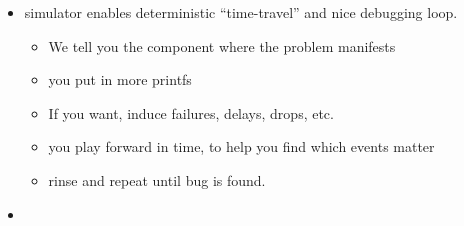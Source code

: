 \begin{itemize}
\begin{itemize}
    \item simulator enables deterministic ``time-travel'' and nice debugging
    loop.
        \begin{itemize}
        \item We tell you the component where the problem manifests
        \item you put in more printfs
        \item If you want, induce failures, delays, drops, etc.
        \item you play forward in time, to help you find which events matter
        \item rinse and repeat until bug is found.
        \end{itemize}
    \item {}
    \end{itemize}
\end{itemize}

